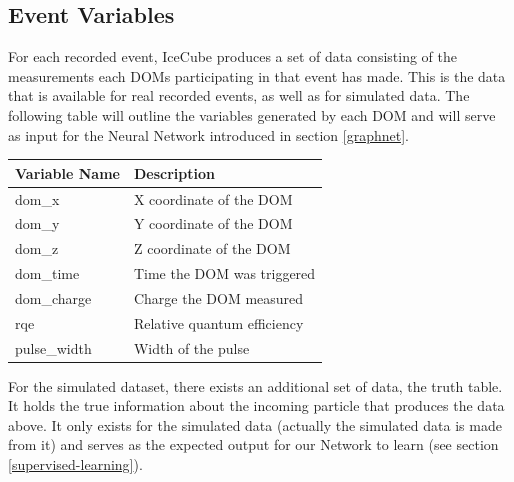 \documentclass[a4paper,10pt]{scrartcl}
\begin{document}
\subsection{Event Variables}
\label{variables}

For each recorded event, IceCube produces a set of data consisting of the measurements each DOMs participating in that event has made.
This is the data that is available for real recorded events, as well as for simulated data.
The following table will outline the variables \cite{graphnet} generated by each DOM and will serve as input for the Neural Network introduced in section \ref{graphnet}.

\begin{center}
    \begin{tabular}{ |l|l| }
        \hline
        Variable Name & Description                 \\
        \hline
        dom\_x        & X coordinate of the DOM     \\
        dom\_y        & Y coordinate of the DOM     \\
        dom\_z        & Z coordinate of the DOM     \\
        dom\_time     & Time the DOM was triggered  \\
        dom\_charge   & Charge the DOM measured     \\
        rqe           & Relative quantum efficiency \\
        pulse\_width  & Width of the pulse          \\
        \hline
    \end{tabular}
\end{center}

For the simulated dataset, there exists an additional set of data, the truth table.
It holds the true information about the incoming particle that produces the data above.
It only exists for the simulated data (actually the simulated data is made from it) and serves as the expected output for our Network to learn (see section \ref{supervised-learning}).
\end{document}
